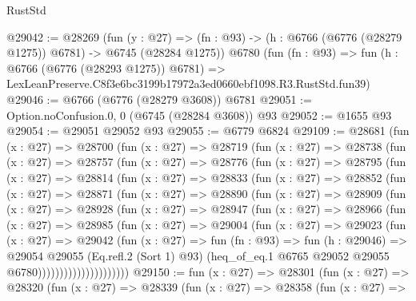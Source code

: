 \begin{lexlean}{RustStd}
\begin{coremodule}
@29042 := @28269
    (fun (y : @27) =>
    (fn : @93) -> (h : @6766 (@6776 (@28279 @1275)) @6781) -> @6745 (@28284 @1275))
    @6780
    (fun (fn : @93) =>
    fun (h : @6766 (@6776 (@28293 @1275)) @6781) =>
    LexLeanPreserve.C8f3e6bc3199b17972a3ed0660ebf1098.R3.RustStd.fun39)
@29046 := @6766 (@6776 (@28279 @3608)) @6781
@29051 := Option.noConfusion.{0, 0} (@6745 (@28284 @3608)) @93
@29052 := @1655 @93
@29054 := @29051 @29052 @93
@29055 := @6779 @6824
@29109 := @28681
    (fun (x : @27) =>
    @28700
      (fun (x : @27) =>
      @28719
        (fun (x : @27) =>
        @28738
          (fun (x : @27) =>
          @28757
            (fun (x : @27) =>
            @28776
              (fun (x : @27) =>
              @28795
                (fun (x : @27) =>
                @28814
                  (fun (x : @27) =>
                  @28833
                    (fun (x : @27) =>
                    @28852
                      (fun (x : @27) =>
                      @28871
                        (fun (x : @27) =>
                        @28890
                          (fun (x : @27) =>
                          @28909
                            (fun (x : @27) =>
                            @28928
                              (fun (x : @27) =>
                              @28947
                                (fun (x : @27) =>
                                @28966
                                  (fun (x : @27) =>
                                  @28985
                                    (fun (x : @27) =>
                                    @29004
                                      (fun (x : @27) =>
                                      @29023
                                        (fun (x : @27) =>
                                        @29042
                                          (fun (x : @27) =>
                                          fun (fn : @93) =>
                                          fun (h : @29046) =>
                                          @29054
                                            @29055
                                            (Eq.refl.{2} (Sort 1) @93)
                                            (heq_of_eq.{1}
                                              @6765
                                              @29052
                                              @29055
                                              @6780)))))))))))))))))))))
@29150 := fun (x : @27) =>
  @28301
    (fun (x : @27) =>
    @28320
      (fun (x : @27) =>
      @28339
        (fun (x : @27) =>
        @28358
          (fun (x : @27) =>

\end{coremodule}
\end{lexlean}
